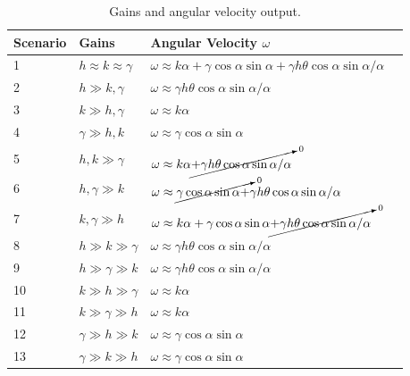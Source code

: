 \documentclass[12pt]{article}
\begin{document}
\begin{table}[ht!]
\caption{Gains and angular velocity output.}
\small
\centering
\begin{tabular}{@{}lllr@{}} \toprule
Scenario & Gains                     & Angular Velocity $\omega$                                                                                     \\ \midrule
1        & $h\approx k\approx\gamma$ & $\omega\approx k\alpha + \gamma\cos\alpha\sin\alpha + \gamma h\theta\cos\alpha\sin\alpha/\alpha$              \\
2        & $h\gg k,\gamma$           & $\omega\approx \gamma h\theta\cos\alpha\sin\alpha/\alpha$                                                     \\
3        & $k\gg h,\gamma$           & $\omega\approx k\alpha$                                                                                       \\
4        & $\gamma\gg h,k$           & $\omega\approx \gamma\cos\alpha\sin\alpha$                                                                    \\
5        & $h,k \gg\gamma$           & $\omega\approx k\alpha\cancelto{0}{+\gamma h\theta\cos\alpha\sin\alpha/\alpha}$                               \\
6        & $h,\gamma\gg k$           & $\omega\approx \cancelto{0}{\gamma\cos\alpha\sin\alpha+} \gamma h\theta\cos\alpha\sin\alpha/\alpha$           \\
7        & $k,\gamma\gg h$           & $\omega\approx k\alpha + \gamma\cos\alpha\sin\alpha \cancelto{0}{+\gamma h\theta\cos\alpha\sin\alpha/\alpha}$ \\
8        & $h\gg k\gg\gamma$         & $\omega\approx \gamma h\theta\cos\alpha\sin\alpha/\alpha$                                                     \\
9        & $h\gg\gamma\gg k$         & $\omega\approx \gamma h\theta\cos\alpha\sin\alpha/\alpha$                                                     \\
10       & $k\gg h\gg\gamma$         & $\omega\approx k\alpha$                                                                                       \\
11       & $k\gg\gamma\gg h$         & $\omega\approx k\alpha$                                                                                       \\
12       & $\gamma\gg h\gg k$        & $\omega\approx \gamma\cos\alpha\sin\alpha$                                                                    \\
13       & $\gamma\gg k\gg h$        & $\omega\approx \gamma\cos\alpha\sin\alpha$                                                                    \\ \bottomrule
\end{tabular}
\label{tab:gainsAngVelOutput}
\end{table}
\end{document}
